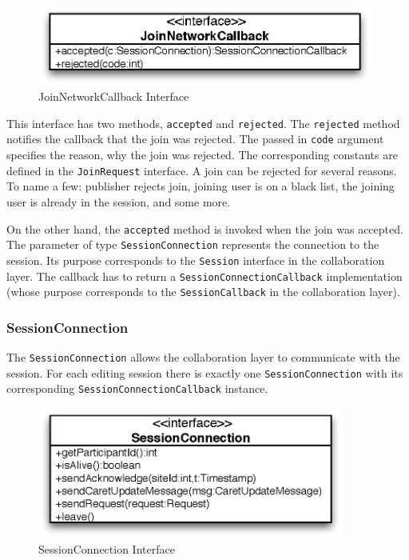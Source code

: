 \begin{figure}[H]
 \centering
 \includegraphics[width=11.04cm,height=2.61cm]{../images/finalreport/architecture_joinnetworkcallback_uml.eps}
 \caption{JoinNetworkCallback Interface}
\end{figure}

This interface has two methods, \texttt{accepted} and \texttt{rejected}.
The \texttt{rejected} method notifies the callback that the join
was rejected. The passed in \texttt{code} argument specifies the reason, why
the join was rejected. The corresponding constants are defined in the
\texttt{JoinRequest} interface. A join can be rejected for several reasons.
To name a few: publisher rejects join, joining user is on a black list,
the joining user is already in the session, and some more.

On the other hand, the \texttt{accepted} method is invoked when the join
was accepted. The parameter of type \texttt{SessionConnection} represents
the connection to the session. Its purpose corresponds to the \texttt{Session}
interface in the collaboration layer. The callback has to return a
\texttt{SessionConnectionCallback} implementation (whose purpose corresponds
to the \texttt{SessionCallback} in the collaboration layer).


\subsubsection{SessionConnection}
The \texttt{SessionConnection} allows the collaboration layer to
communicate with the session. For each editing session there is
exactly one \texttt{SessionConnection} with its corresponding
\texttt{SessionConnectionCallback} instance.

\begin{figure}[H]
 \centering
 \includegraphics[width=10.09cm,height=4.30cm]{../images/finalreport/architecture_sessionconnection_uml.eps}
 \caption{SessionConnection Interface}
\end{figure}

